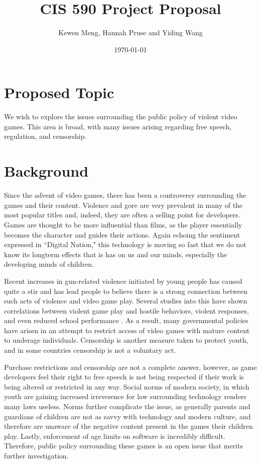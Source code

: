 \documentclass[12pt]{article}
\title{CIS 590 Project Proposal}
\author{Kewen Meng, Hannah Pruse and Yiding Wang}
\date{\today}
\begin{document}
\maketitle
\vspace{-10mm}
\section*{Proposed Topic}
We wish to explore the issues surrounding the public policy of violent video games. This area is broad, with many issues arising regarding free speech, regulation, and censorship. 

\section*{Background}
\indent\indent Since the advent of video games, there has been a controversy surrounding the games and their content. Violence and gore are very prevalent in many of the most popular titles and, indeed, they are often a selling point for developers. Games are thought to be more influential than films, as the player essentially becomes the character and guides their actions. Again echoing the sentiment expressed in ``Digital Nation," this technology is moving so fast that we do not know its longterm effects that is has on us and our minds, especially the developing minds of children.

Recent increases in gun-related violence initiated by young people has caused quite a stir and has lead people to believe there is a strong connection between such acts of violence and video game play. Several studies into this have shown correlations between violent game play and hostile behaviors, violent responses, and even reduced school performance \cite{barlett2009, gentile2004, anderson2003}. As a result, many governmental policies have arisen in an attempt to restrict access of video games with mature content to underage individuals. Censorship is another measure taken to protect youth, and in some countries censorship is not a voluntary act.

Purchase restrictions and censorship are not a complete answer, however, as game developers feel their right to free speech is not being respected if their work is being altered or restricted in any way. Social norms of modern society, in which youth are gaining increased irreverence for law surrounding technology renders many laws useless. Norms further complicate the issue, as generally parents and guardians of children are not as savvy with technology and modern culture, and therefore are unaware of the negative content present in the games their children play. Lastly, enforcement of age limits on software is incredibly difficult. Therefore, public policy surrounding these games is an open issue that merits further investigation.
\end{document}
